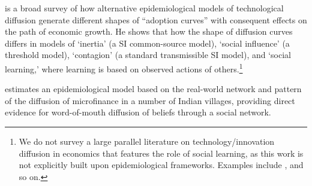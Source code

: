\href{https://github.com/iworld1991/EpiExp/blob/master/Literature/young2009innovation.pdf}{\cite{young2009innovation}} is a broad survey of how alternative epidemiological models of technological diffusion generate different shapes of  ``adoption curves'' with consequent effects on the path of economic growth. He shows that how the shape of diffusion curves differs in models of `inertia' (a SI common-source model), `social influence' (a threshold model), `contagion' (a standard transmissible SI model), and `social learning,' where learning is based on observed actions of others.\footnote{We do not survey a large parallel literature on technology/innovation diffusion in economics that features the role of social learning, as this work is not explicitly built upon epidemiological frameworks. Examples include  \href{https://www.researchgate.net/publication/222676428_Social_Learning_in_a_Heterogeneous_Population_Technology_Diffusion_in_the_Indian_Green_Revolution}{\cite{munshi2004social}},   \href{https://www.jstor.org/stable/41038754}{\cite{comin2010exploration}} and so on.}  %


\href{https://pubmed.ncbi.nlm.nih.gov/23888042/}{\cite{banerjee2013diffusion}} estimates an epidemiological model based on the real-world network and pattern of the diffusion of microfinance in a number of Indian villages, providing direct evidence for word-of-mouth diffusion of beliefs through a social network. %

